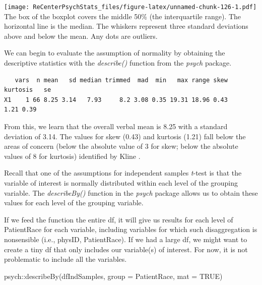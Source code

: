 \documentclass[
  11pt,
]{book}
\newenvironment{Shaded}{\begin{snugshade}}{\end{snugshade}}
\newcommand{\AttributeTok}[1]{\textcolor[rgb]{0.77,0.63,0.00}{#1}}
\newcommand{\ConstantTok}[1]{\textcolor[rgb]{0.00,0.00,0.00}{#1}}
\newcommand{\FunctionTok}[1]{\textcolor[rgb]{0.00,0.00,0.00}{#1}}
\newcommand{\NormalTok}[1]{#1}
\newcommand{\SpecialCharTok}[1]{\textcolor[rgb]{0.00,0.00,0.00}{#1}}
\begin{document}
\texttt{[image: ReCenterPsychStats\_files/figure-latex/unnamed-chunk-126-1.pdf]}
The box of the boxplot covers the middle 50\% (the interquartile range). The horizontal line is the median. The whiskers represent three standard deviations above and below the mean. Any dots are outliers.

We can begin to evaluate the assumption of normality by obtaining the descriptive statistics with the \emph{describe()} function from the \emph{psych} package.

\begin{Shaded}
\end{Shaded}

\begin{verbatim}
   vars  n mean   sd median trimmed  mad  min   max range skew kurtosis   se
X1    1 66 8.25 3.14   7.93     8.2 3.08 0.35 19.31 18.96 0.43     1.21 0.39
\end{verbatim}

From this, we learn that the overall verbal mean is 8.25 with a standard deviation of 3.14. The values for skew (0.43) and kurtosis (1.21) fall below the areas of concern (below the absolute value of 3 for skew; below the absolute values of 8 for kurtosis) identified by Kline \citeyearpar{kline_principles_2016}.

Recall that one of the assumptions for independent samples \emph{t}-test is that the variable of interest is normally distributed within each level of the grouping variable. The \emph{describeBy()} function in the \emph{psych} package allows us to obtain these values for each level of the grouping variable.

If we feed the function the entire df, it will give us results for each level of PatientRace for each variable, including variables for which such disaggregation is nonsensible (i.e., physID, PatientRace). If we had a large df, we might want to create a tiny df that only includes our variable(s) of interest. For now, it is not problematic to include all the variables.

\begin{Shaded}
\begin{Highlighting}[]
\NormalTok{psych}\SpecialCharTok{::}\FunctionTok{describeBy}\NormalTok{(dfIndSamples, }\AttributeTok{group =}\NormalTok{ PatientRace, }\AttributeTok{mat =} \ConstantTok{TRUE}\NormalTok{)}
\end{Highlighting}
\end{Shaded}
\end{document}

